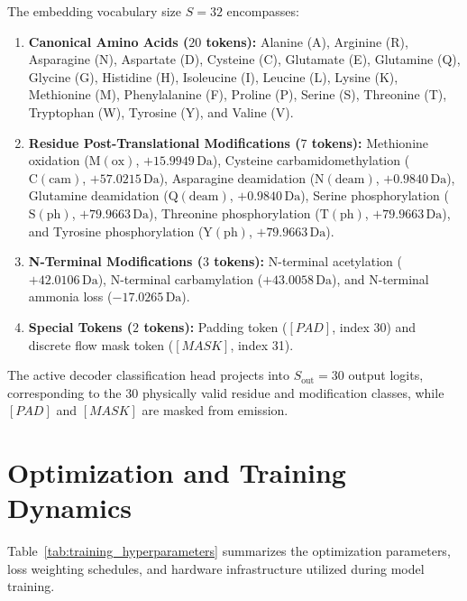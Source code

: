 The embedding vocabulary size $S = 32$ encompasses:
\begin{enumerate}[(1)]
\item \textbf{Canonical Amino Acids ($20$ tokens):} Alanine (A), Arginine (R), Asparagine (N), Aspartate (D), Cysteine (C), Glutamate (E), Glutamine (Q), Glycine (G), Histidine (H), Isoleucine (I), Leucine (L), Lysine (K), Methionine (M), Phenylalanine (F), Proline (P), Serine (S), Threonine (T), Tryptophan (W), Tyrosine (Y), and Valine (V).
\item \textbf{Residue Post-Translational Modifications ($7$ tokens):} Methionine oxidation ($\text{M}(\text{ox})$, $+15.9949\,\text{Da}$), Cysteine carbamidomethylation ($\text{C}(\text{cam})$, $+57.0215\,\text{Da}$), Asparagine deamidation ($\text{N}(\text{deam})$, $+0.9840\,\text{Da}$), Glutamine deamidation ($\text{Q}(\text{deam})$, $+0.9840\,\text{Da}$), Serine phosphorylation ($\text{S}(\text{ph})$, $+79.9663\,\text{Da}$), Threonine phosphorylation ($\text{T}(\text{ph})$, $+79.9663\,\text{Da}$), and Tyrosine phosphorylation ($\text{Y}(\text{ph})$, $+79.9663\,\text{Da}$).
\item \textbf{N-Terminal Modifications ($3$ tokens):} N-terminal acetylation ($+42.0106\,\text{Da}$), N-terminal carbamylation ($+43.0058\,\text{Da}$), and N-terminal ammonia loss ($-17.0265\,\text{Da}$).
\item \textbf{Special Tokens ($2$ tokens):} Padding token ($[PAD]$, index 30) and discrete flow mask token ($[MASK]$, index 31).
\end{enumerate}
The active decoder classification head projects into $S_{\text{out}} = 30$ output logits, corresponding to the 30 physically valid residue and modification classes, while $[PAD]$ and $[MASK]$ are masked from emission.

\section{Optimization and Training Dynamics}

Table~\ref{tab:training_hyperparameters} summarizes the optimization parameters, loss weighting schedules, and hardware infrastructure utilized during model training.

